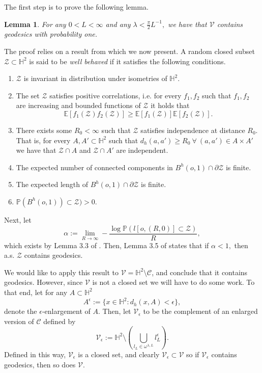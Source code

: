 \documentclass[a4paper,12pt]{article}
\newcommand{\BE}{{\mathbb{E}}}
\newcommand{\BH}{{\mathbb{H}}}
\newcommand{\BP}{{\mathbb{P}}}
\newcommand{\CC}{{\mathcal{C}}}
\newcommand{\CV}{{\mathcal{V}}}
\newcommand{\CZ}{{\mathcal{Z}}}
\newtheorem{lemma}[theorem]{Lemma}
\begin{document}
\medskip

The first step is to prove the following lemma.
\begin{lemma} \label{lemma:CVgeodesics}
For any $0<L<\infty$ and any $\lambda<\frac{\pi}{2}L^{-1},$ we have that $\CV$ contains 
geodesics with probability one.
\end{lemma}
The proof relies on a result from \cite{BJST_09} which we now present.
A random closed subset $\CZ\subset \BH^2$ is said to be 
{\em well behaved} if it satisfies the 
following conditions.
\begin{enumerate}
    \item $\CZ$ is invariant in distribution under isometries of $\BH^2.$

    \item The set $\CZ$ satisfies positive correlations, i.e. for every $f_1,f_2$ 
    such that $f_1,f_2$ are increasing and bounded functions of $\CZ$ it holds that
    \[
    \BE[f_1(\CZ)f_2(\CZ)] \geq \BE[f_1(\CZ)]\BE[f_2(\CZ)].
    \]

    \item There exists some $R_0<\infty$ such that $\CZ$ satisfies independence at distance $R_0.$
    That is, for every $A,A'\subset \BH^2$ such that 
    $d_h(a,a')\geq R_0 \ \forall \ (a,a')\in A \times A'$ we have that
    $\CZ\cap A$ and $\CZ\cap A'$ are independent.

    \item The expected number of connected components in $B^h(o,1)\cap \partial \CZ$ is 
    finite.

    \item The expected length of $B^h(o,1)\cap \partial \CZ$ is finite.

    \item $\BP(B^h(o,1))\subset \CZ)>0$.
\end{enumerate}
Next, let 
\begin{equation} \label{eqn:alphadef}
\alpha:=\lim_{R \to \infty} -\frac{\log \BP(l[o,(R,0)]\subset \CZ)}{R},    
\end{equation}
which exists by Lemma 3.3 of \cite{BJST_09}. Then, Lemma 3.5 of \cite{BJST_09} states that if $\alpha<1,$
then a.s. $\CZ$ contains geodesics. 
 

We would like to apply this result to $\CV=\BH^2 \setminus \CC$, and conclude that 
it contains geodesics. However, since $\CV$ is not a closed set 
we will have to do some work. To that end, let for any $A\subset \BH^2$ 
\[
A^\epsilon:=\{x\in \BH^2: d_h(x,A)<\epsilon\},
\]
denote the $\epsilon$-enlargement of $A.$ Then, let
$\CV_\epsilon$ to be the complement of an enlarged version of $\CC$
defined by
\[
\CV_\epsilon
:=\BH^2 \setminus \left(\bigcup_{l_L\in \omega^{\lambda,L}} l_L^\epsilon\right).
\]
Defined in this way, $\CV_\epsilon$ is a closed set, and clearly $\CV_\epsilon \subset \CV$ so 
if $\CV_\epsilon$ contains geodesics, then so does $\CV$. 
\end{document}
